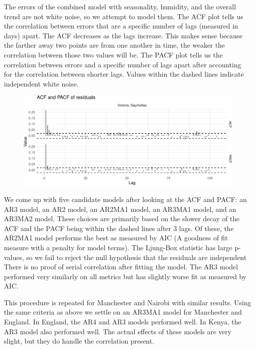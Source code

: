 \documentclass[
  letterpaper,
  DIV=11,
  numbers=noendperiod]{scrartcl}
\begin{document}
The errors of the combined model with seasonality, humidity, and the
overall trend are not white noise, so we attempt to model them. The ACF
plot tells us the correlation between errors that are a specific number
of lags (measured in days) apart. The ACF decreases as the lags
increase. This makes sense because the farther away two points are from
one another in time, the weaker the correlation between those two values
will be. The PACF plot tells us the correlation between errors and a
specific number of lags apart after accounting for the correlation
between shorter lags. Values within the dashed lines indicate
independent white noise.

\begin{figure}

{\centering \includegraphics{FinalReport_files/figure-pdf/unnamed-chunk-13-1.pdf}

}

\end{figure}

We come up with five candidate models after looking at the ACF and PACF:
an AR3 model, an AR2 model, an AR2MA1 model, an AR3MA1 model, and an
AR3MA2 model. These choices are primarily based on the slower decay of
the ACF and the PACF being within the dashed lines after 3 lags. Of
these, the AR2MA1 model performs the best as measured by AIC (A goodness
of fit measure with a penalty for model terms). The Ljung-Box statistic
has large p-values, so we fail to reject the null hypothesis that the
residuals are independent There is no proof of serial correlation after
fitting the model. The AR3 model performed very similarly on all metrics
but has slightly worse fit as measured by AIC.

This procedure is repeated for Manchester and Nairobi with similar
results. Using the same criteria as above we settle on an AR3MA1 model
for Manchester and England. In England, the AR4 and AR3 models performed
well. In Kenya, the AR3 model also performed well. The actual effects of
these models are very slight, but they do handle the correlation
present.
\end{document}
